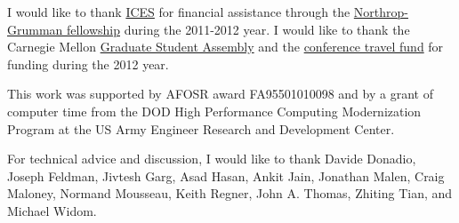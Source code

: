 \documentclass[12pt]{cmuthesis}
\begin{document}
\begin{acknowledgments}
I would like to thank 
\href{http://www.ices.cmu.edu/home.asp}{ICES} 
for financial assistance through the 
\href{http://www.ices.cmu.edu/northrop-grumman.asp}
{Northrop-Grumman fellowship} during the 2011-2012 year. 
I would like to thank the Carnegie Mellon 
\href{http://www.cmu.edu/stugov/gsa/}{Graduate Student Assembly} and the 
\href{http://www.cmu.edu/graduate/professional-development/conference-funding/}
{conference travel fund} for funding during the 2012 year.

This work was supported by AFOSR award FA95501010098 and by a grant 
of computer time from the DOD 
High Performance Computing Modernization Program at the US Army Engineer 
Research and Development Center. 

For technical advice and discussion, I would like to thank  
Davide Donadio, Joseph Feldman, Jivtesh Garg, Asad Hasan, 
Ankit Jain, Jonathan Malen, Craig Maloney, Normand Mousseau,  
Keith Regner, John A. Thomas, Zhiting Tian, and Michael Widom. 
\end{acknowledgments}

\end{document}
